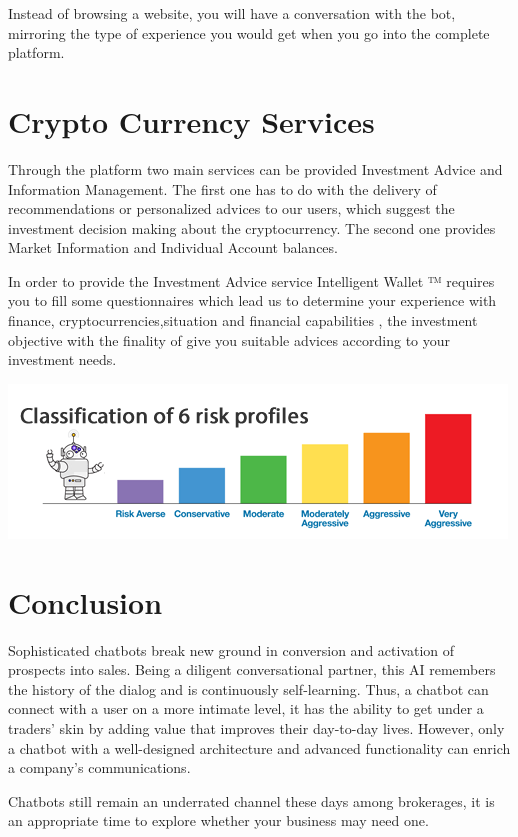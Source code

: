 \documentclass[	DIV=calc,%
							paper=letter,%
							fontsize=12pt%
                            ]{scrartcl}	 					%
\begin{document}
Instead of browsing a website, you will have a conversation with the bot, mirroring the type of experience you would get when you go into the complete platform.

\section{\label{sec:level1}Crypto Currency Services}
Through the platform two main services can be provided\: Investment Advice and Information Management. The first one has to do with the delivery of recommendations or personalized advices to our users, which suggest the investment decision making about the cryptocurrency. The second one provides Market Information and Individual Account balances.


In order to provide the Investment Advice service Intelligent Wallet ™ requires you to fill some questionnaires  which lead us to determine your experience with finance, cryptocurrencies,situation and financial capabilities , the investment objective with the finality of give you suitable advices according to your investment needs.

\includegraphics[scale=0.65]{img/risks.png}\vspace*{1.5cm}

\section{\label{sec:level1}Conclusion}
Sophisticated chatbots break new ground in conversion and activation of prospects into sales. Being a diligent conversational partner, this AI remembers the history of the dialog and is continuously self-learning. Thus, a chatbot can connect with a user on a more intimate level, it has the ability to get under a traders’ skin by adding value that improves their day-to-day lives. However, only a chatbot with a well-designed architecture and advanced functionality can enrich a company’s communications. \cite{Barbara_CL2018}

Chatbots still remain an underrated channel these days among brokerages, it is an appropriate time to explore whether your business may need one.

\newpage


\end{document}
